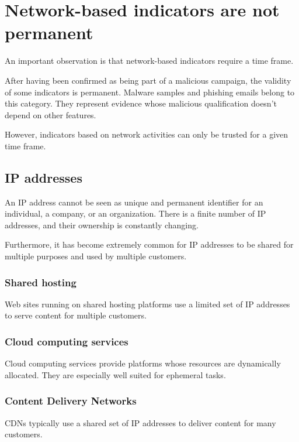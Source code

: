 \documentclass[conference]{IEEEtran}
\begin{document}
\section{Network-based indicators are not permanent}

An important observation is that network-based indicators require a time frame.

After having been confirmed as being part of a malicious campaign, the validity of some indicators is permanent.
Malware samples and phishing emails belong to this category. They represent evidence whose malicious qualification doesn't depend on other features.

However, indicators based on network activities can only be trusted for a given time frame.

\subsection{IP addresses}

An IP address cannot be seen as unique and permanent identifier for an individual, a company, or an organization. There is a finite number of IP addresses, and their ownership is constantly changing.

Furthermore, it has become extremely common for IP addresses to be shared for multiple purposes and used by multiple customers.

\subsubsection{Shared hosting}

Web sites running on shared hosting platforms use a limited set of IP addresses to serve content for multiple customers.

\subsubsection{Cloud computing services}

Cloud computing services provide platforms whose resources are dynamically allocated. They are especially well suited for ephemeral tasks.

\subsubsection{Content Delivery Networks}

CDNs typically use a shared set of IP addresses to deliver content for many customers.
\end{document}
